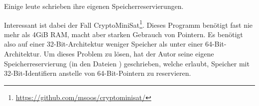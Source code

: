 
Einige leute schrieben ihre eigenen Speicherreservierungen.

Interessant ist dabei der Fall CryptoMiniSat\footnote{\url{https://github.com/msoos/cryptominisat/}}.
Dieses Programm benötigt fast nie mehr als 4GiB \ac{RAM}, macht aber starken Gebrauch von Pointern.
Es benötigt also auf einer 32-Bit-Architektur weniger Speicher als unter einer 64-Bit-Architektur.
Um dieses Problem zu lösen, hat der Autor seine eigene Speicherreservierung (in den Dateien
) geschrieben, welche erlaubt, Speicher mit 32-Bit-Identifiern anstelle von 64-Bit-Pointern
zu reservieren.

